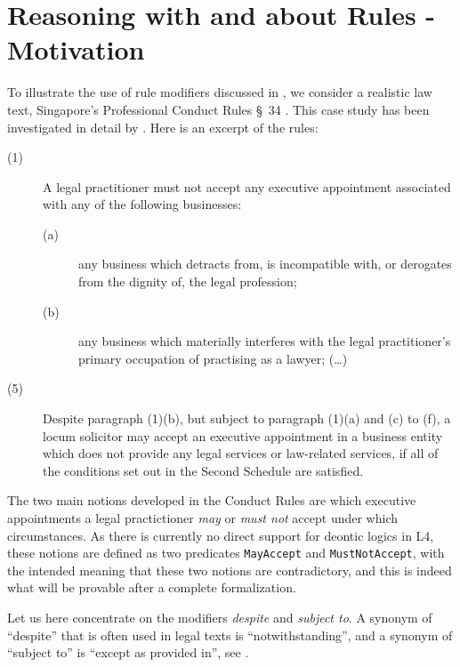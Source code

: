 \section{Reasoning with and about Rules - Motivation}\label{sec:reasoning_with_rules_app}

To illustrate the use of rule modifiers discussed in
, we consider a realistic law text,
Singapore's Professional Conduct Rules \S~34
\citep{professional_conduct_rules}. This case study has been investigated in
detail by \cite{morris21:_const_answer_set_progr_tool}. Here is an excerpt of
the rules:

\begin{description}
\item[(1)] A legal practitioner must not accept any executive appointment
  associated with any of the following businesses: 
  \begin{description}
  \item[(a)] any business which detracts from, is incompatible with, or
    derogates from the dignity of, the legal profession;
  \item[(b)] any business which materially interferes with the legal
    practitioner’s primary occupation of practising as a lawyer; (\dots)
  \end{description}
\item[(5)] Despite paragraph (1)(b), but subject to paragraph (1)(a) and (c)
  to (f), a locum solicitor may accept an executive appointment in a business
  entity which does not provide any legal services or law-related services, if
  all of the conditions set out in the Second Schedule are satisfied.
\end{description}

The two main notions developed in the Conduct Rules are which executive appointments a legal
practictioner \emph{may} or \emph{must not} accept under which
circumstances. As there is currently no direct support for deontic logics in
L4, these notions are defined as two predicates \texttt{MayAccept} and
\texttt{MustNotAccept}, with the intended meaning that these two notions are
contradictory, and this is indeed what will be provable after a complete
formalization.

Let us here concentrate on the modifiers \emph{despite} and \emph{subject
  to}. A synonym of ``despite'' that is often used in legal texts is
``notwithstanding'',  and a synonym of
``subject to'' is ``except as provided in'', see \cite{adams_contract_drafting_2004}.

